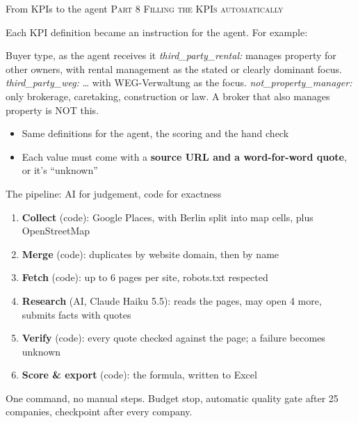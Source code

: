 \documentclass[aspectratio=169,11pt]{beamer}
\newcommand{\partlabel}[1]{{\small\color{assume}\textsc{#1}}\par\vspace{0.3em}}
\begin{document}
\begin{frame}{From KPIs to the agent}
  \partlabel{Part 8 \textbullet{} Filling the KPIs automatically}
  Each KPI definition became an instruction for the agent. For example:
  \vspace{0.4em}

  \small
  \begin{block}{Buyer type, as the agent receives it}
    \emph{third\_party\_rental:} manages property for other owners, with rental management as
    the stated or clearly dominant focus. \emph{third\_party\_weg:} \dots{} with
    WEG-Verwaltung as the focus. \emph{not\_property\_manager:} only brokerage, caretaking,
    construction or law. A broker that also manages property is NOT this.
  \end{block}
  \normalsize
  \begin{itemize}
    \item Same definitions for the agent, the scoring and the hand check
    \item Each value must come with a \textbf{source URL and a word-for-word quote}, or it's
          ``unknown''
  \end{itemize}
\end{frame}

\begin{frame}{The pipeline: AI for judgement, code for exactness}
  \begin{enumerate}
    \item \textbf{Collect} (code): Google Places, with Berlin split into map cells, plus
          OpenStreetMap
    \item \textbf{Merge} (code): duplicates by website domain, then by name
    \item \textbf{Fetch} (code): up to 6 pages per site, robots.txt respected
    \item \textbf{Research} (AI, Claude Haiku 5.5): reads the pages, may open 4 more, submits
          facts with quotes
    \item \textbf{Verify} (code): every quote checked against the page; a failure becomes
          unknown
    \item \textbf{Score \& export} (code): the formula, written to Excel
  \end{enumerate}
  \vspace{0.4em}
  One command, no manual steps. Budget stop, automatic quality gate after 25 companies,
  checkpoint after every company.
\end{frame}
\end{document}
